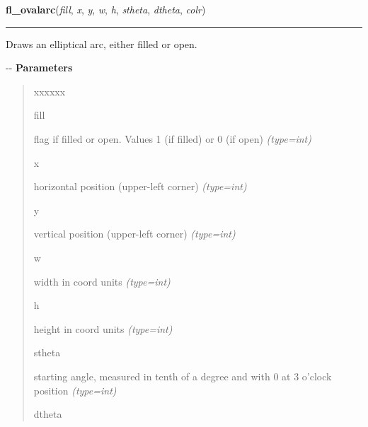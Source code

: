     \label{xformslib:flxbasic:fl_ovalarc}

    \vspace{0.5ex}

\hspace{.8\funcindent}\begin{boxedminipage}{\funcwidth}

    \raggedright \textbf{fl\_ovalarc}(\textit{fill}, \textit{x}, \textit{y}, \textit{w}, \textit{h}, \textit{stheta}, \textit{dtheta}, \textit{colr})

    \vspace{-1.5ex}

    \rule{\textwidth}{0.5\fboxrule}
\setlength{\parskip}{2ex}

Draws an elliptical arc, either filled or open.

-{}-
\setlength{\parskip}{1ex}
      \textbf{Parameters}
      \vspace{-1ex}

      \begin{quote}
        \begin{Ventry}{xxxxxx}

          \item[fill]


flag if filled or open. Values 1 (if filled) or 0 (if open)
            {\it (type=int)}

          \item[x]


horizontal position (upper-left corner)
            {\it (type=int)}

          \item[y]


vertical position (upper-left corner)
            {\it (type=int)}

          \item[w]


width in coord units
            {\it (type=int)}

          \item[h]


height in coord units
            {\it (type=int)}

          \item[stheta]


starting angle, measured in tenth of a degree and with 0 at 3
o'clock position
            {\it (type=int)}

          \item[dtheta]



\end{Ventry}
\end{quote}
\end{boxedminipage}
